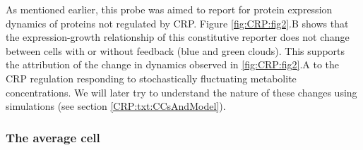 {%
%
As mentioned earlier, this probe was aimed to report for protein expression dynamics of proteins not regulated by CRP.
%
Figure \ref{fig:CRP:fig2}.B shows that the expression-growth relationship of this constitutive reporter does not change between cells with or without feedback (blue and green clouds).
This supports the attribution of the change in dynamics observed in \ref{fig:CRP:fig2}.A to the CRP regulation responding to stochastically fluctuating metabolite concentrations.
%
We will later try to understand the nature of these changes using simulations (see section \ref{CRP:txt:CCsAndModel}).
}


\subsubsection{The average cell}


